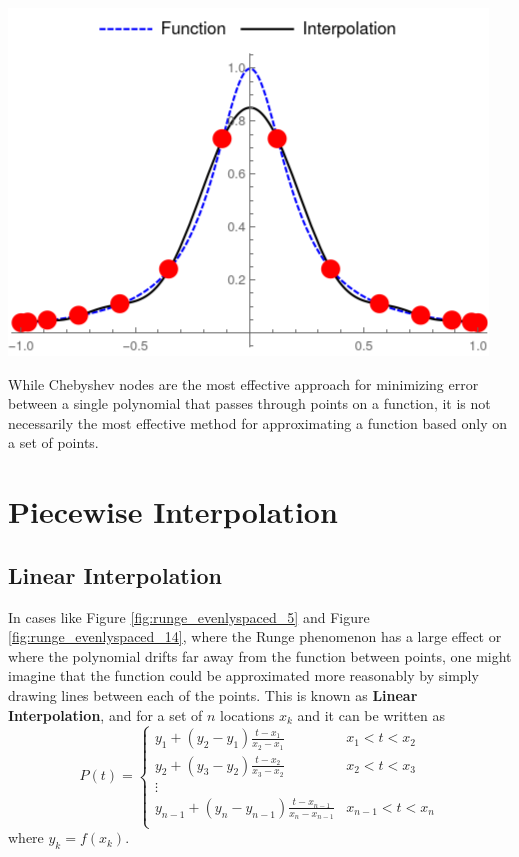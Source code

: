 \documentclass{article}
\begin{document}
{\begin{minipage}{0.3\textwidth}
        \includegraphics[width=\linewidth]{Images/RungeInterpolation_Chebyshev/runge_interpolation_14.png}
        \captionsetup{justification=centering}
    \end{minipage}
}
\medbreak

While Chebyshev nodes are the most effective approach for minimizing error between a single polynomial that passes through points on a function, it is not necessarily the most effective method for approximating a function based only on a set of points.

\section{Piecewise Interpolation}

\subsection{Linear Interpolation}

In cases like Figure \ref{fig:runge_evenlyspaced_5} and Figure \ref{fig:runge_evenlyspaced_14}, where the Runge phenomenon has a large effect or where the polynomial drifts far away from the function between points, one might imagine that the function could be approximated more reasonably by simply drawing lines between each of the points. This is known as \textbf{Linear Interpolation}, and for a set of $n$ locations $x_k$ and it can be written as
\[
    P(t) = \begin{cases}
        y_1 + (y_2-y_1)\frac{t-x_1}{x_2-x_1}                 & x_1 < t < x_2     \\
        y_2 + (y_3-y_2)\frac{t-x_2}{x_3-x_2}                 & x_2 < t < x_3     \\
        \vdots                                                                   \\
        y_{n-1} + (y_n-y_{n-1})\frac{t-x_{n-1}}{x_n-x_{n-1}} & x_{n-1} < t < x_n \\
    \end{cases}
\]
where $y_k=f(x_k)$.
\end{document}
